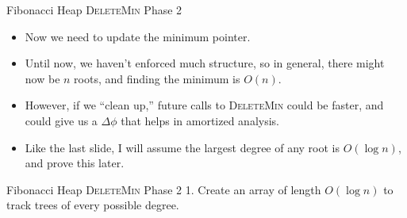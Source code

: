\documentclass[aspectratio=169]{beamer}
\begin{document}
\begin{frame}{Fibonacci Heap \textsc{DeleteMin} Phase 2}
    \begin{itemize}
        \item Now we need to update the minimum pointer.\pause
        \item Until now, we haven't enforced much structure, so in general, there might now be $n$ roots, and finding the minimum is \textcolor{sigma@mainblue}{$O(n)$}.\pause
        \item However, if we ``clean up,'' future calls to \textsc{DeleteMin} could be faster, and could give us a $\Delta \phi$ that helps in amortized analysis.\pause
        \item Like the last slide, I will assume the largest degree of any root is \textcolor{sigma@mainblue}{$O(\log n)$}, and prove this later.
    \end{itemize}
\end{frame}
\begin{frame}{Fibonacci Heap \textsc{DeleteMin} Phase 2}
    1. Create an array of length \textcolor{sigma@mainblue}{$O(\log n)$} to track trees of every possible degree.

    \begin{center}
    \end{center}
\end{frame}
\end{document}
